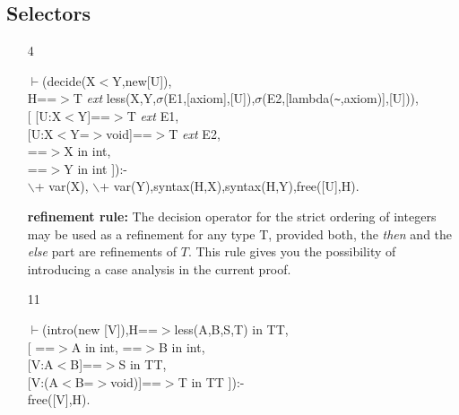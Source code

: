 \documentclass[11pt]{report}
\begin{document}
 \subsection{Selectors}
  
 \begin{enumerate}
 \item[4]
\begin{sf}\begin{tabbing}
$\vdash$(decide(X$<$Y,new[U]),\\[-0.15ex]
\hspace{2em}H==$>$T \mbox{\it ext} less(X,Y,$\sigma$(E1,[axiom],[U]),$\sigma$(E2,[lambda({\verb`~`},axiom)],[U])),\\[-0.15ex]
\hspace{2em}[ [U:X$<$Y]==$>$T \mbox{\it ext} E1, \\[-0.15ex]
\hspace{2em}[U:X$<$Y=$>$void]==$>$T \mbox{\it ext} E2,\\[-0.15ex]
\hspace{4em}==$>$X in int,\\[-0.15ex]
\hspace{4em}==$>$Y in int ]):-\\[-0.15ex]
\hspace{2em}$\backslash$+ var(X), $\backslash$+ var(Y),syntax(H,X),syntax(H,Y),free([U],H).
\end{tabbing}\end{sf}

 {\bf refinement rule:}
 The decision operator for the strict ordering of integers may be 
 used as a refinement for any type T, provided both, the \emph{then} 
 and the \emph{else} part are refinements of $T$. This rule gives
 you the possibility of introducing a case analysis in the
 current proof.   
  
 \item[11]
\begin{sf}\begin{tabbing}
$\vdash$(intro(new [V]),H==$>$less(A,B,S,T) in TT,\\[-0.15ex]
\hspace{2em}[ ==$>$A in int, ==$>$B in int,\\[-0.15ex]
\hspace{3em}[V:A$<$B]==$>$S in TT, \\[-0.15ex]
\hspace{3em}[V:(A$<$B=$>$void)]==$>$T in TT ]):-\\[-0.15ex]
\hspace{2em}free([V],H). 
\end{tabbing}\end{sf}


\end{enumerate}
\end{document}
